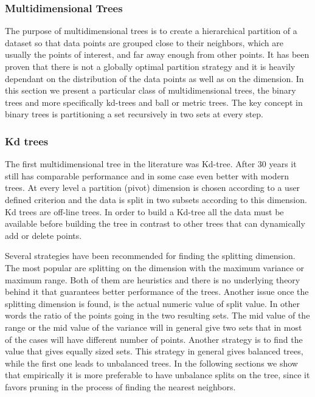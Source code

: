 \documentclass[12pt,letterpaper,doublespaced,ETD,dvips,proposal]{gtthesis}
\begin{document}
\begin{Body}
\subsubsection{Multidimensional Trees}
\label{Multidimensional_Trees}

The purpose of multidimensional trees is to create a hierarchical
partition of a dataset so that data points are grouped close to
their neighbors, which are usually the points of interest, and far
away enough from other points. It has been proven that there is not
a globally optimal partition strategy and it is heavily dependant on
the distribution of the data points as well as on the dimension. In
this section we present a particular class of multidimensional
trees, the binary trees and more specifically kd-trees and ball or
metric trees. The key concept in binary trees is partitioning a set
recursively in two sets at every step.

\subsubsection{Kd trees}
\label{Kd_trees}

The first multidimensional tree in the literature was Kd-tree. After
30 years it still has comparable performance and in some case even
better with modern trees. At every level a partition (pivot)
dimension is chosen according to a user defined criterion and the
data is split in two subsets according to this dimension. Kd trees
are off-line trees. In order to build a Kd-tree all the data must be
available before building the tree in contrast to other trees that
can dynamically add or delete points.

Several strategies have been recommended for finding the splitting
dimension. The most popular are splitting on the dimension with the
maximum variance or maximum range. Both of them are heuristics and
there is no underlying theory behind it that guarantees better
performance of the trees. Another issue once the splitting dimension
is found, is the actual numeric value of split value. In other words
the ratio of the points going in the two resulting sets. The mid
value of the range or the mid value of the variance will in general
give two sets that in most of the cases will have different number
of points. Another strategy is to find the value that gives equally
sized sets. This strategy in general gives balanced trees, while the
first one leads to unbalanced trees. In the following sections we
show that empirically it is more preferable to have unbalance splits
on the tree, since it favors pruning in the process of finding the
nearest neighbors.


\end{Body}
\end{document}
